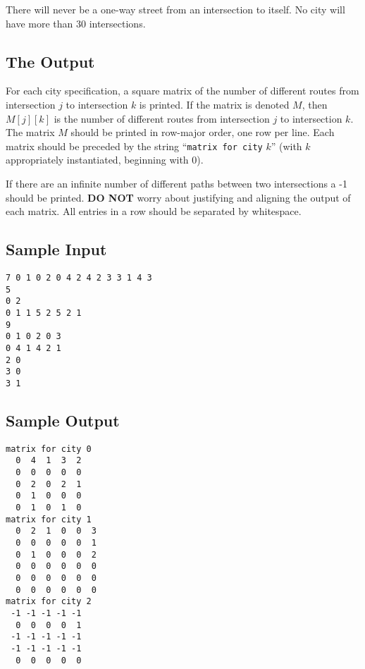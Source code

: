 There will never be a one-way street from an intersection to itself.
No city will have more than 30 intersections.

\subsection*{The Output}
For each city specification, a square matrix of the number of different routes
from intersection $j$ to intersection $k$ is printed.  If the matrix is
denoted $M$, then $M[j][k]$ is the number of different routes from
intersection $j$ to intersection $k$.  The matrix $M$ should be printed
in row-major order, one row per line.  Each matrix should be preceded by
the string ``\verb!matrix for city! $k$'' (with $k$ appropriately
instantiated, beginning with 0). 

If there are an infinite number of different paths between two
intersections a -1 should be printed.  {\bf DO NOT} worry about
justifying and aligning the output of each matrix.  All entries in a
row should be separated by whitespace.

\subsection*{Sample Input}
{\small\begin{verbatim}
7 0 1 0 2 0 4 2 4 2 3 3 1 4 3
5 
0 2 
0 1 1 5 2 5 2 1
9
0 1 0 2 0 3
0 4 1 4 2 1
2 0
3 0
3 1
\end{verbatim}}


\subsection*{Sample Output}
{\small\begin{verbatim}
matrix for city 0
  0  4  1  3  2
  0  0  0  0  0
  0  2  0  2  1
  0  1  0  0  0
  0  1  0  1  0
matrix for city 1
  0  2  1  0  0  3
  0  0  0  0  0  1
  0  1  0  0  0  2
  0  0  0  0  0  0
  0  0  0  0  0  0
  0  0  0  0  0  0
matrix for city 2
 -1 -1 -1 -1 -1
  0  0  0  0  1
 -1 -1 -1 -1 -1
 -1 -1 -1 -1 -1
  0  0  0  0  0
\end{verbatim}}



\label{lastpage}

